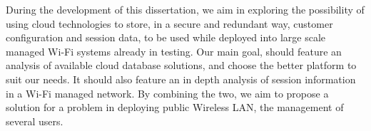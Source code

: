 
During the development of this dissertation, we aim in exploring the possibility of using cloud technologies to store, in a secure and redundant way, customer configuration and session data, to be used while deployed into large scale managed Wi-Fi systems already in testing. Our main goal, should feature an analysis of available cloud database solutions, and choose the better platform to suit our needs. It should also feature an in depth analysis of session information in a Wi-Fi managed network. By combining the two, we aim to propose a solution for a problem in deploying public Wireless LAN, the management of several users.
 